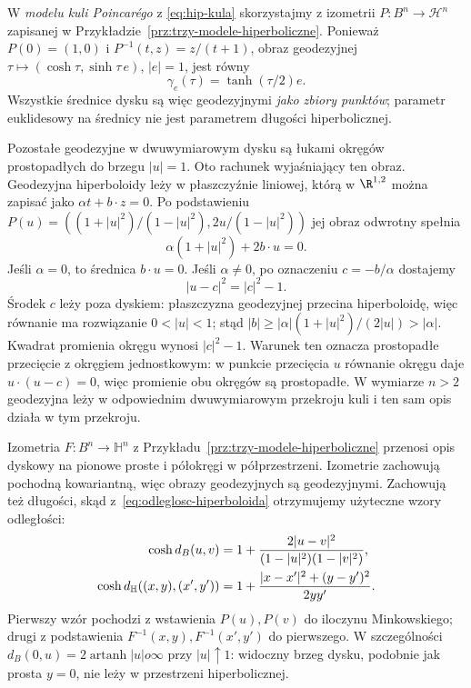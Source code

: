 \begin{przyklad}
W \emph{modelu kuli Poincarégo} z
\eqref{eq:hip-kula} skorzystajmy z izometrii
$P:B^n\to\mathcal H^n$ zapisanej w
Przykładzie~\ref{prz:trzy-modele-hiperboliczne}.
Ponieważ $P(0)=(1,0)$ i
$P^{-1}(t,z)=z/(t+1)$, obraz geodezyjnej
$\tau\mapsto(\cosh\tau,\sinh\tau\,e)$,
$|e|=1$, jest równy
\begin{equation}\label{eq:geodezyjna-dysk-radialna}
 \gamma_e(\tau)=\tanh(\tau/2)e.
\end{equation}
Wszystkie średnice dysku są więc geodezyjnymi
\emph{jako zbiory punktów}; parametr euklidesowy
na średnicy nie jest parametrem długości hiperbolicznej.

Pozostałe geodezyjne w dwuwymiarowym dysku są
łukami okręgów prostopadłych do brzegu $|u|=1$.
Oto rachunek wyjaśniający ten obraz. Geodezyjna
hiperboloidy leży w płaszczyźnie liniowej, którą
w $\R^{1,2}$ można zapisać jako
$\alpha t+b\cdot z=0$. Po podstawieniu
$P(u)=((1+|u|^2)/(1-|u|^2),2u/(1-|u|^2))$
jej obraz odwrotny spełnia
\[
 \alpha(1+|u|^2)+2b\cdot u=0.
\]
Jeśli $\alpha=0$, to średnica $b\cdot u=0$.
Jeśli $\alpha\ne0$, po oznaczeniu $c=-b/\alpha$
dostajemy
\begin{equation}\label{eq:geodezyjna-dysk-okrag}
 |u-c|^2=|c|^2-1.
\end{equation}
Środek $c$ leży poza dyskiem: płaszczyzna geodezyjnej
przecina hiperboloidę, więc równanie ma rozwiązanie
$0<|u|<1$; stąd
$|b|\geq |\alpha|(1+|u|^2)/(2|u|)>|\alpha|$.
Kwadrat promienia
okręgu wynosi $|c|^2-1$. Warunek ten oznacza
prostopadłe przecięcie z okręgiem jednostkowym:
w punkcie przecięcia $u$ równanie okręgu daje
$u\cdot(u-c)=0$, więc promienie obu okręgów
są prostopadłe. W wymiarze $n>2$ geodezyjna
leży w odpowiednim dwuwymiarowym przekroju
kuli i ten sam opis działa w tym przekroju.

Izometria $F:B^n\to\mathbb H^n$ z
Przykładu~\ref{prz:trzy-modele-hiperboliczne}
przenosi opis dyskowy na pionowe proste
i półokręgi w półprzestrzeni. Izometrie
zachowują pochodną kowariantną, więc obrazy
geodezyjnych są geodezyjnymi. Zachowują też
długości, skąd z~\eqref{eq:odleglosc-hiperboloida}
otrzymujemy użyteczne wzory odległości:
\begin{align}\label{eq:odleglosci-modele-hiperboliczne}
 \cosh d_B(u,v)
  &=1+\frac{2|u-v|^2}
      {(1-|u|^2)(1-|v|^2)},\\
 \cosh d_{\mathbb H}((x,y),(x',y'))
  &=1+\frac{|x-x'|^2+(y-y')^2}{2yy'}.\notag
\end{align}
Pierwszy wzór pochodzi z wstawienia $P(u),P(v)$
do iloczynu Minkowskiego; drugi z podstawienia
$F^{-1}(x,y),F^{-1}(x',y')$ do pierwszego.
W szczególności
$d_B(0,u)=2\operatorname{artanh}|u|	o\infty$
przy $|u|\uparrow1$: widoczny brzeg dysku,
podobnie jak prosta $y=0$, nie leży w przestrzeni
hiperbolicznej.
\end{przyklad}

